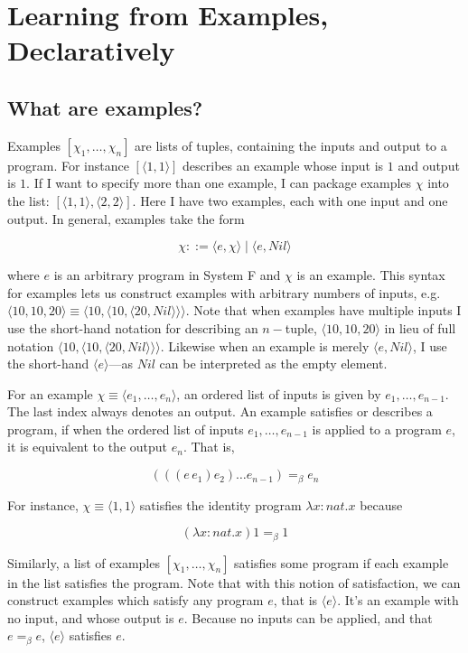 \documentclass[acmsmall]{acmart}
\newcommand{\lam}{\lambda}
\theoremstyle{mytheoremstyle}
\begin{document}
\section{Learning from Examples, Declaratively}

\subsection{What are examples?}

Examples $[\chi_1,\dots,\chi_n]$ are lists of tuples, containing the inputs and output to a program. For instance $[\langle1,1\rangle]$ describes an example whose input is $1$ and output is $1$. If I want to specify more than one example, I can package examples $\chi$ into the list: $[\langle 1,1\rangle, \langle2,2\rangle]$. Here I have two examples, each with one input and one output. In general, examples take the form \vspace{-1.0em}
\begin{singlespace}
$$\chi ::= \langle e, \chi\rangle \mid \langle e,Nil\rangle$$
\end{singlespace}
where $e$ is an arbitrary program in System F and $\chi$ is an example. This syntax for examples lets us construct examples with arbitrary numbers of inputs, e.g. $\langle10,10,20\rangle \equiv \langle 10, \langle 10, \langle 20,Nil\rangle\rangle\rangle.$ Note that when examples have multiple inputs I use the short-hand notation for describing an $n-$tuple, $\langle10,10,20\rangle$ in lieu of full notation $ \langle 10, \langle 10, \langle 20,Nil\rangle\rangle\rangle$. Likewise when an example is merely $\langle e,Nil\rangle$, I use the short-hand $\langle e\rangle$---as $Nil$ can be interpreted as the empty element.

For an example $\chi \equiv \langle e_1,\dots,e_n\rangle$, an ordered list of inputs is given by $e_1,\dots,e_{n-1}$. The last index always denotes an output. An example satisfies or describes a program, if when the ordered list of inputs $e_1,\dots,e_{n-1}$ is applied to a program $e$, it is equivalent to the output $e_n$. That is,\vspace{-1.0em}
\begin{singlespace}
$$(((e\,e_1)e_2)\dots e_{n-1}) =_\beta e_n$$
\end{singlespace}
For instance, $\chi \equiv \langle 1,1\rangle$ satisfies the identity program $\lam x{:}nat.x$ because \vspace{-1.0em}
\begin{singlespace}
$$(\lam x{:}nat.x)1 =_\beta 1$$
\end{singlespace}
Similarly, a list of examples $[\chi_1,\dots,\chi_n]$ satisfies some program if each example in the list satisfies the program. Note that with this notion of satisfaction, we can construct examples which satisfy any program $e$, that is $\langle e\rangle$. It's an example with no input, and whose output is $e$. Because no inputs can be applied, and that $e =_\beta e$, $\langle e\rangle$ satisfies $e$.
\end{document}
